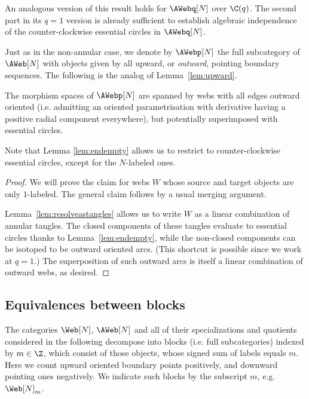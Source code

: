 An analogous version of this result holds for $\AWebq[N]$ over $\C(q)$. The second part in its $q=1$ version is already sufficient to establish algebraic independence of the counter-clockwise essential circles in $\AWebq[N]$.

Just as in the non-annular case, we denote by $\AWebp[N]$ the full subcategory
of $\AWeb[N]$ with objects given by all upward, or \emph{outward}, pointing
boundary sequences. The following is the analog of Lemma~\ref{lem:upward}.

\begin{lemma}\label{lem:upwardannulus} The morphism spaces of $\AWebp[N]$ are
spanned by webs with all edges outward oriented (i.e. admitting an oriented parametrisation with
derivative having a positive radial component everywhere), but potentially superimposed with
essential circles.
\end{lemma}

Note that Lemma \ref{lem:endempty} allows us to restrict to counter-clockwise
essential circles, except for the $N$-labeled ones.

\begin{proof}
 We will prove the claim for webs $W$ whose source and target objects are only $1$-labeled. The general claim follows by a usual merging argument.

Lemma~\ref{lem:resolveastangles} allows us to write $W$ as a linear combination of annular tangles. The closed components of these tangles evaluate to essential circles thanks to Lemma~\ref{lem:endempty}, while the non-closed components can be isotoped to be outward oriented arcs. (This shortcut is possible since we work at $q=1$.) The superposition of such outward arcs is itself a linear combination of outward webs, as desired. 
\end{proof}




\subsection{Equivalences between blocks}\label{sec:lambdaequiv}


The categories $\Web[N]$, $\AWeb[N]$ and all of their specializations and
quotients considered in the following decompose into blocks (i.e. full
subcategories) indexed by $m\in \Z$, which consist of those objects, whose
signed sum of labels equals $m$. Here we count upward oriented boundary points
positively, and downward pointing ones negatively. We indicate such blocks by
the subscript $m$, e.g. $\Web[N]_{m}$.

